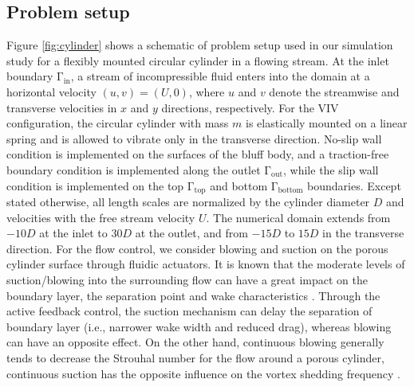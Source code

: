 \documentclass[standard]{jfm}
\begin{document}
\subsection{Problem setup}
Figure \ref{fig:cylinder} shows a schematic of problem setup used in our simulation study 
for a flexibly mounted circular cylinder in a flowing stream. 
At the inlet boundary $\mathrm{\Gamma_{in}}$, a stream of incompressible fluid 
enters into the domain at a horizontal velocity $(u,v)=(U,0)$, where $u$ and $v$ 
denote the streamwise and transverse velocities in $x$ and $y$ directions, respectively. 
For the VIV configuration, the circular cylinder with mass $m$ is elastically mounted on a 
linear spring and is allowed to vibrate only in the transverse direction. 
No-slip wall condition is implemented on the surfaces of the bluff body, and a traction-free
boundary condition is implemented along the outlet $\mathrm{\Gamma_{out}}$, 
while the slip wall condition is implemented on the top $\mathrm{\Gamma_{top}}$
and bottom $\mathrm{\Gamma_{bottom}}$ boundaries.
Except stated otherwise, all length scales are normalized by 
the cylinder diameter $D$ and velocities
with the free stream velocity $U$.
%
The numerical domain extends from $-10D$ at the inlet to $30D$ at the outlet, 
and from $-15D$ to $15D$ in the transverse direction.
For the flow control, we consider blowing and suction on the porous cylinder 
surface through fluidic actuators. It is known that 
the moderate levels of suction/blowing into the surrounding flow can 
have a great impact on the boundary layer, the separation point and  
wake characteristics \citep{Fransson20041031,Chen201325,Chen2015}. 
Through the active feedback control, the suction 
mechanism can delay the separation of boundary layer 
(i.e., narrower wake width and reduced drag), whereas 
blowing can have an opposite effect. On the other hand, continuous blowing generally 
tends to decrease the Strouhal number for the flow around a porous cylinder, 
continuous suction has the opposite influence on the vortex shedding 
frequency \citep{Fransson20041031}.
\end{document}
